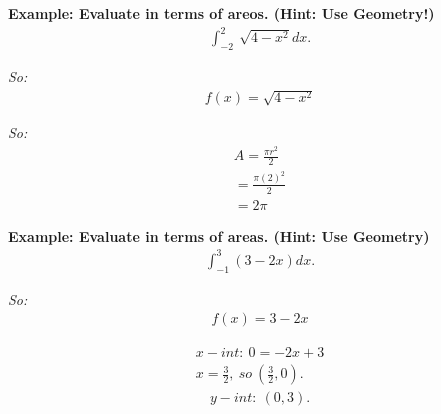 \documentclass{report}
\begin{document}
\bigbreak \noindent 
\begin{mdframed}
  \textbf{Example: Evaluate in terms of areos. (Hint: Use Geometry!)}
  \begin{align*}
    \int_{-2}^{2}\ \sqrt{4-x^{2}}dx
  .\end{align*}
\end{mdframed}

\bigbreak \noindent
\textit{So:}
\begin{align*}
  f(x) = \sqrt{4-x^{2}}
\end{align*}

\bigbreak \noindent \bigbreak \noindent
{}
% 

\begin{figure}[ht]
  \centering
  \label{fig:circlefig}
\end{figure}

\bigbreak \noindent
\textit{So:}
\begin{align*}
  A = \frac{\pi r^{2}}{2 } \\
  = \frac{\pi(2)^{2}}{2} \\
  \boxed{= 2\pi}
\end{align*}

\bigbreak \noindent 
\begin{mdframed}
  \textbf{Example: Evaluate in terms of areas. (Hint: Use Geometry)}
  \begin{align*}
    \int_{-1}^{3}(3-2x)dx
  .\end{align*}
\end{mdframed}

\bigbreak \noindent
\textit{So:}
\begin{align*}
  f(x) = 3-2x
\end{align*}

\bigbreak \noindent 
{}

\begin{align*}
  x-int:\ 0 = -2x+3 \\
  x=\frac{3}{2},\ so\ (\frac{3}{2}, 0)
.\end{align*}
\begin{align*}
  y-int:\ (0,3)
.\end{align*}
\end{document}
